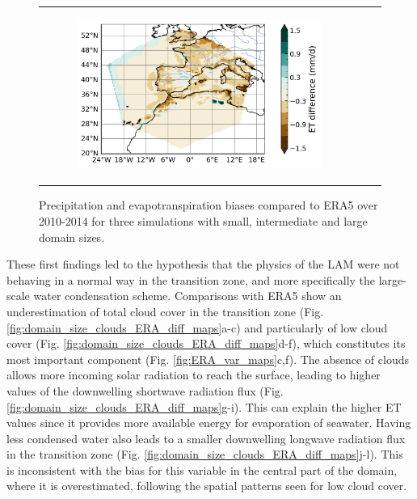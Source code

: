 \begin{figure}[htbp]
\begin{tabular}{ccc}
\begin{subfigure}[b]{0.33\textwidth}
            \includegraphics[width=\textwidth]{images/chap4/domain_size/diff_map_evap_era_LAM_2000km_NBP80.png}
        \end{subfigure} 
    \end{tabular}
    \caption{Precipitation and evapotranspiration biases compared to ERA5 over 2010-2014 for three simulations with small, intermediate and large domain sizes.}
    \label{fig:domain_size_P_ET_ERA_diff_maps}
\end{figure}

These first findings led to the hypothesis that the physics of the LAM were not behaving in a normal way in the transition zone, and more specifically the large-scale water condensation scheme. 
Comparisons with ERA5 show an underestimation of total cloud cover in the transition zone (Fig. \ref{fig:domain_size_clouds_ERA_diff_maps}a-c) and particularly of low cloud cover (Fig. \ref{fig:domain_size_clouds_ERA_diff_maps}d-f), which constitutes its most important component (Fig. \ref{fig:ERA_var_maps}c,f).
The absence of clouds allows more incoming solar radiation to reach the surface, leading to higher values of the downwelling shortwave radiation flux (Fig. \ref{fig:domain_size_clouds_ERA_diff_maps}g-i). This can explain the higher ET values since it provides more available energy for evaporation of seawater.
Having less condensed water also leads to a smaller downwelling longwave radiation flux in the transition zone (Fig. \ref{fig:domain_size_clouds_ERA_diff_maps}j-l). This is inconsistent with the bias for this variable in the central part of the domain, where it is overestimated, following the spatial patterns seen for low cloud cover.


